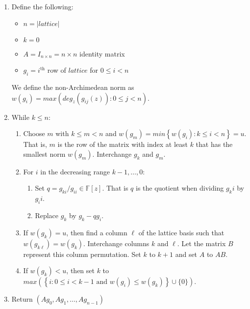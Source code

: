 \documentclass[10pt]{article}
\newcommand{\barred}[1]
	{\left| #1 \right|}
\newcommand{\paren}[1]
	{\left( #1 \right)}
\newcommand{\braced}[1]
	{\left\{ #1 \right\}}
\begin{document}
\begin{enumerate}
\item Define the following:
		\begin{itemize}
		\item $n = \barred{lattice}$
		\item $k = 0$
		\item $A = I_{n \times n} = n \times n$ identity matrix
		\item $g_i = i^{\textrm{th}}$ row of $lattice$ for $0 \leq i < n$
		\end{itemize}
		We define the non-Archimedean norm as $w(g_i) = max\paren{deg_z\paren{g_{ij}(z)} : 0 \leq j < n}$.
		
\item While $k \leq n$:
		\begin{enumerate}
		\item Choose $m$ with $k \leq m < n$ and $w(g_m) = min\braced{w(g_i) : k \leq i < n} = u$.
				That is, $m$ is the row of the matrix with index at least $k$ that has the smallest norm $w(g_m)$.
				Interchange $g_k$ and $g_m$.
		\item For $i$ in the decreasing range $k-1, \ldots, 0$:
				\begin{enumerate}
				\item Set $q = g_{ki} / g_{ii} \in \mathbb{F}[z]$.  That is $q$ is the quotient when dividing $g_ki$ by $g_ii$.
				\item Replace $g_k$ by $g_k - qg_i$.
				\end{enumerate}
		\item If $w(g_k) = u$, then find a column $\ell$ of the lattice basis such that $w(g_{k\ell}) = w(g_k)$.
				Interchange columns $k$ and $\ell$.  Let the matrix $B$ represent this column permutation.  Set $k$ to $k + 1$
				and set $A$ to $AB$.
		\item If $w(g_k) < u$, then set $k$ to $max\paren{\braced{i : 0 \leq i < k - 1 \textrm{ and } w(g_i) \leq w(g_k)} \cup \{0\}}$.
		\end{enumerate}
\item Return $\paren{Ag_0, Ag_1, \ldots, Ag_{n-1}}$
\end{enumerate}
\end{document}
